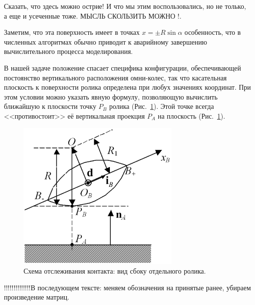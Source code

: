 
Сказать, что здесь можно острие!
И что мы этим воспользовались, но не только, а еще и усеченные тоже.
    МЫСЛЬ СКОЛЬЗИТЬ МОЖНО !.

Заметим, что эта поверхность имеет  в 
точках $x=\pm R\sin\alpha $ особенность, что в численных алгоритмах обычно приводит к аварийному завершению вычислительного процесса моделирования.

В нашей задаче положение спасает специфика конфигурации, обеспечивающей 
постоянство вертикального расположения омни-колес, так что касательная плоскость к поверхности ролика определена при любух значениях координат. При этом условии можно
указать явную формулу, позволяющую вычислить ближайшую к плоскости точку $P_B$
ролика (Рис.~\ref{ContactScheme}). Этой точке всегда <<противостоит>> её 
вертикальная проекция $P_A$ на плоскость (Рис.~\ref{ContactScheme}).

\begin{figure}[htb]
\centering\includegraphics[width=8cm]{content/parts/3_friction/nd/RollerSection_d_ib.png}
\caption{Схема отслеживания контакта: вид сбоку отдельного ролика.}
\label{ContactScheme}
\end{figure}

!!!!!!!!!!!!!!В последующем тексте:
меняем обозначения на принятые ранее, убираем произведение матриц.

